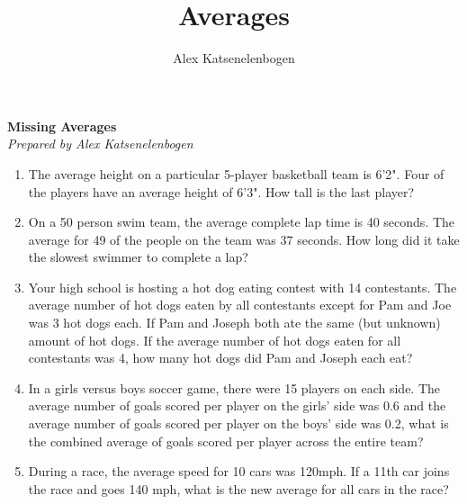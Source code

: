 \documentclass{article}
\title{Averages}
\author{Alex Katsenelenbogen}
\begin{document}
\begin{center}
      \Large\textbf{Missing Averages}\\
      \large\textit{Prepared by Alex Katsenelenbogen}
   \end{center}

\begin{enumerate}

\item
The average height on a particular 5-player basketball team is 6'2". Four of the players have an average height of 6'3". How tall is the last player?

\item 
On a 50 person swim team, the average complete lap time is 40 seconds. The average for 49 of the people on the team was 37 seconds. How long did it take the slowest swimmer to complete a lap?

\item 
Your high school is hosting a hot dog eating contest with 14 contestants. The average number of hot dogs  eaten by all contestants except for Pam and Joe was 3 hot dogs each. If Pam and Joseph both ate the same (but unknown) amount of hot dogs. If the average number of hot dogs eaten for all contestants was 4, how many hot dogs did Pam and Joseph each eat?

\item 
In a girls versus boys soccer game, there were 15 players on each side. The average number of goals scored per player on the girls' side was 0.6 and the average number of goals scored per player on the boys' side was 0.2, what is the combined average of goals scored per player across the entire team?

\item
During a race, the average speed for 10 cars was 120mph. If a 11th car joins the race and goes 140 mph, what is the new average for all cars in the race?



\end{enumerate}
\end{document}

